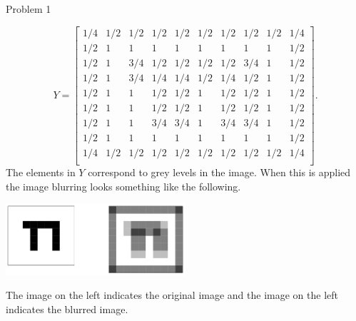 \begin{problem}{Problem 1}
\begin{highlight}[Solution]
        \begin{equation}
            Y = 
            \begin{bmatrix}
                1/4 & 1/2 & 1/2 & 1/2 & 1/2 & 1/2 & 1/2 & 1/2 & 1/2 & 1/4 \\
                1/2 & 1 & 1 & 1 & 1 & 1 & 1 & 1 & 1 & 1/2 \\
                1/2 & 1 & 3/4 & 1/2 & 1/2 & 1/2 & 1/2 & 3/4 & 1 & 1/2 \\
                1/2 & 1 & 3/4 & 1/4 & 1/4 & 1/2 & 1/4 & 1/2 & 1 & 1/2 \\
                1/2 & 1 & 1 & 1/2 & 1/2 & 1 & 1/2 & 1/2 & 1 & 1/2 \\
                1/2 & 1 & 1 & 1/2 & 1/2 & 1 & 1/2 & 1/2 & 1 & 1/2 \\
                1/2 & 1 & 1 & 3/4 & 3/4 & 1 & 3/4 & 3/4 & 1 & 1/2 \\
                1/2 & 1 & 1 & 1 & 1 & 1 & 1 & 1 & 1 & 1/2 \\
                1/4 & 1/2 & 1/2 & 1/2 & 1/2 & 1/2 & 1/2 & 1/2 & 1/2 & 1/4 \\
            \end{bmatrix}.
        \end{equation}
        The elements in $Y$ correspond to grey levels in the image. When this is applied the image blurring looks something like the following.

        \begin{center}
            \includegraphics[width = 0.5\textwidth]{Images/Gray Levels.png}
        \end{center}
        The image on the left indicates the original image and the image on the left indicates the blurred image.
    \end{highlight}
\end{problem}

